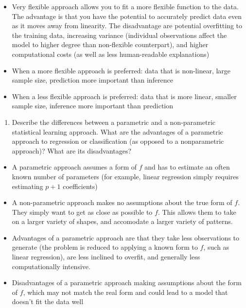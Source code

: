 \documentclass[]{book}
\providecommand{\tightlist}{%
  \setlength{\itemsep}{0pt}\setlength{\parskip}{0pt}}
\theoremstyle{definition}
\theoremstyle{definition}
\theoremstyle{definition}
\theoremstyle{remark}
\begin{document}
\begin{itemize}
\tightlist
\item
  Very flexible approach allows you to fit a more flexible function to
  the data. The advantage is that you have the potential to accurately
  predict data even as it moves away from linearity. The disadvantage
  are potential overfitting to the training data, increasing variance
  (individual observations affect the model to higher degree than
  non-flexible counterpart), and higher computational costs (as well as
  less human-readable explanations)
\item
  When a more flexible approach is preferred: data that is non-linear,
  large sample size, prediction more important than inference
\item
  When a less flexible approach is preferred: data that is more linear,
  smaller sample size, inference more important than prediction
\end{itemize}

\begin{enumerate}
\def\labelenumi{\arabic{enumi}.}
\setcounter{enumi}{5}
\tightlist
\item
  Describe the differences between a parametric and a non-parametric
  statistical learning approach. What are the advantages of a parametric
  approach to regression or classification (as opposed to a
  nonparametric approach)? What are its disadvantages?
\end{enumerate}

\begin{itemize}
\tightlist
\item
  A parametric approach assumes a form of \(f\) and has to estimate an
  often known number of parameters (for example, linear regression
  simply requires estimating \(p+1\) coefficients)
\item
  A non-parametric approach makes no assumptions about the true form of
  \(f\). They simply want to get as close as possible to \(f\). This
  allows them to take on a larger variety of shapes, and accomodate a
  larger variety of patterns.
\item
  Advantages of a parametric approach are that they take less
  observations to generate (the problem is reduced to applying a known
  form to \(f\), such as linear regression), are less inclined to
  overfit, and generally less computationally intensive.
\item
  Disadvantages of a parametric approach making assumptions about the
  form of \(f\), which may not match the real form and could lead to a
  model that doesn't fit the data well
\end{itemize}
\end{document}
